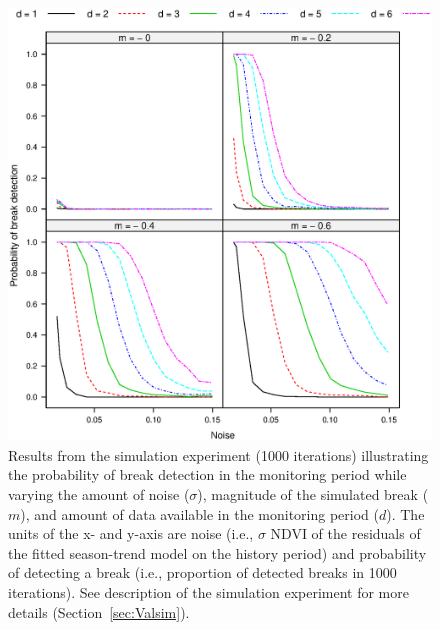 \documentclass[authoryear,preprint,review,10pt]{elsarticle}
\begin{document}
\begin{figure}[htp]
\centering
    \includegraphics[height=0.9\textwidth]{figs/Fig4_NrDetections_Time_1000.eps}
  \caption{Results from the simulation experiment (1000 iterations) illustrating the probability of break detection in the monitoring period while varying
  the amount of noise ($\sigma$), magnitude of the simulated break ($m$), and amount of data  available in the monitoring period ($d$). The units of the x- and y-axis are noise (i.e., $\sigma$ NDVI of the residuals of the fitted season-trend model on the history period) and probability of detecting a break (i.e., proportion of detected breaks in 1000 iterations). See description of the simulation experiment for more details (Section~\ref{sec:Valsim}). }
  \label{fig:SimNr}
\end{figure}
\end{document}
